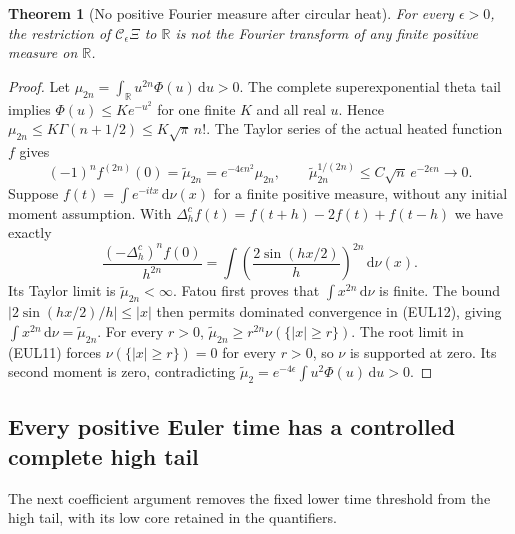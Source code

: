 \documentclass[11pt]{article}
\newtheorem{theorem}{Theorem}
\theoremstyle{remark}\newtheorem{remark}[theorem]{Remark}
\newcommand{\R}{\mathbb R}
\newcommand{\dd}{\,\mathrm d}
\begin{document}
\begin{theorem}[No positive Fourier measure after circular heat]
\label{thm:euler-no-positive-measure}
For every $\epsilon>0$, the restriction of
$\mathcal C_\epsilon\Xi$ to $\R$ is not the Fourier transform
of any finite positive measure on $\R$.
\end{theorem}
\begin{proof}
Let $\mu_{2n}=\int_{\R}u^{2n}\Phi(u)\dd u>0$.
The complete superexponential theta tail implies
$\Phi(u)\le Ke^{-u^2}$ for one finite $K$ and all real $u$.
Hence
$\mu_{2n}\le K\Gamma(n+1/2)\le K\sqrt\pi\,n!$.
The Taylor series of the actual heated function $f$ gives
\[
 (-1)^nf^{(2n)}(0)=\widetilde\mu_{2n}
        =e^{-4\epsilon n^2}\mu_{2n},\qquad
 \widetilde\mu_{2n}^{1/(2n)}
        \le C\sqrt n\,e^{-2\epsilon n}\longrightarrow0. \tag{EUL11}
\]
Suppose $f(t)=\int e^{-itx}\dd\nu(x)$ for a finite positive
measure, without any initial moment assumption.
With $\Delta_h^cf(t)=f(t+h)-2f(t)+f(t-h)$ we have exactly
\[
 \frac{(-\Delta_h^c)^nf(0)}{h^{2n}}
       =\int\left(\frac{2\sin(hx/2)}h\right)^{2n}\dd\nu(x).
                                                               \tag{EUL12}
\]
Its Taylor limit is $\widetilde\mu_{2n}<\infty$.
Fatou first proves that $\int x^{2n}\dd\nu$ is finite.
The bound $|2\sin(hx/2)/h|\le|x|$ then permits dominated
convergence in (EUL12), giving
$\int x^{2n}\dd\nu=\widetilde\mu_{2n}$.
For every $r>0$,
$\widetilde\mu_{2n}\ge r^{2n}\nu(\{|x|\ge r\})$.
The root limit in (EUL11) forces $\nu(\{|x|\ge r\})=0$
for every $r>0$, so $\nu$ is supported at zero.
Its second moment is zero, contradicting
$\widetilde\mu_2=e^{-4\epsilon}\int u^2\Phi(u)\dd u>0$.
\end{proof}

\subsection*{Every positive Euler time has a controlled complete high tail}
The next coefficient argument removes the fixed lower time threshold
from the high tail, with its low core retained in the quantifiers.
\end{document}
